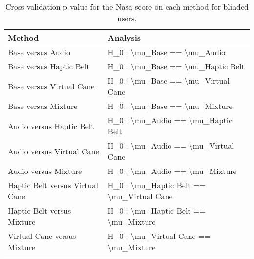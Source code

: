 
\begin{table}[!htb]
\centering
\caption{Cross validation p-value for the Nasa score on each method for blinded users.}
\label{tab:lsd_nasa}
\begin{tabular}{ll}
\toprule
                         Method &                                  Analysis \\
\midrule
              Base versus Audio &               H\_0 : \textbackslash mu\_Base == \textbackslash mu\_Audio \\
        Base versus Haptic Belt &         H\_0 : \textbackslash mu\_Base == \textbackslash mu\_Haptic Belt \\
       Base versus Virtual Cane &        H\_0 : \textbackslash mu\_Base == \textbackslash mu\_Virtual Cane \\
            Base versus Mixture &             H\_0 : \textbackslash mu\_Base == \textbackslash mu\_Mixture \\
       Audio versus Haptic Belt &        H\_0 : \textbackslash mu\_Audio == \textbackslash mu\_Haptic Belt \\
      Audio versus Virtual Cane &       H\_0 : \textbackslash mu\_Audio == \textbackslash mu\_Virtual Cane \\
           Audio versus Mixture &            H\_0 : \textbackslash mu\_Audio == \textbackslash mu\_Mixture \\
Haptic Belt versus Virtual Cane & H\_0 : \textbackslash mu\_Haptic Belt == \textbackslash mu\_Virtual Cane \\
     Haptic Belt versus Mixture &      H\_0 : \textbackslash mu\_Haptic Belt == \textbackslash mu\_Mixture \\
    Virtual Cane versus Mixture &     H\_0 : \textbackslash mu\_Virtual Cane == \textbackslash mu\_Mixture \\
\bottomrule
\end{tabular}
\end{table}

